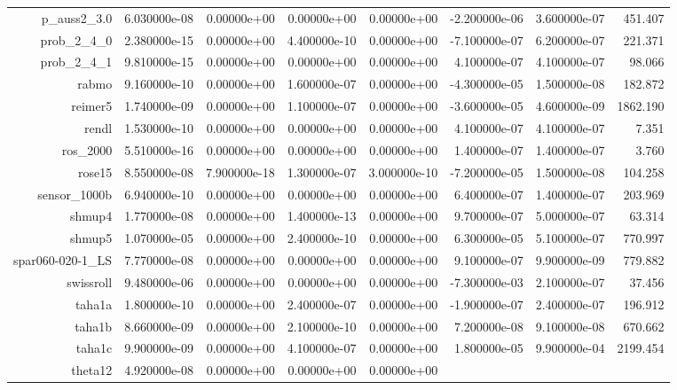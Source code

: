 {{\begin{table}[h]
\begin{center}
{\begin{tabular}{r|r|r|r|r|r|r|r}
	  p\_auss2\_3.0 & 6.030000e-08 & 0.00000e+00 & 0.00000e+00 & 0.00000e+00 &
      -2.200000e-06 & 3.600000e-07 & 451.407\\
      prob\_2\_4\_0 & 2.380000e-15 & 0.00000e+00 & 4.400000e-10 & 0.00000e+00
      & -7.100000e-07 & 6.200000e-07 & 221.371\\
      prob\_2\_4\_1 & 9.810000e-15 & 0.00000e+00 & 0.00000e+00 & 0.00000e+00 &
      4.100000e-07 & 4.100000e-07 & 98.066\\
      rabmo & 9.160000e-10 & 0.00000e+00 & 1.600000e-07 & 0.00000e+00 &
      -4.300000e-05 & 1.500000e-08 & 182.872\\
      reimer5 & 1.740000e-09 & 0.00000e+00 & 1.100000e-07 & 0.00000e+00 &
      -3.600000e-05 & 4.600000e-09 & 1862.190\\
      rendl & 1.530000e-10 & 0.00000e+00 & 0.00000e+00 & 0.00000e+00 &
      4.100000e-07 & 4.100000e-07 & 7.351\\
      ros\_2000 & 5.510000e-16 & 0.00000e+00 & 0.00000e+00 & 0.00000e+00 &
      1.400000e-07 & 1.400000e-07 & 3.760\\
      rose15 & 8.550000e-08 & 7.900000e-18 & 1.300000e-07 & 3.000000e-10 &
      -7.200000e-05 & 1.500000e-08 & 104.258\\
      sensor\_1000b & 6.940000e-10 & 0.00000e+00 & 0.00000e+00 & 0.00000e+00 &
      6.400000e-07 & 1.400000e-07 & 203.969\\
      shmup4 & 1.770000e-08 & 0.00000e+00 & 1.400000e-13 & 0.00000e+00 &
      9.700000e-07 & 5.000000e-07 & 63.314\\
      shmup5 & 1.070000e-05 & 0.00000e+00 & 2.400000e-10 & 0.00000e+00 &
      6.300000e-05 & 5.100000e-07 & 770.997\\
      spar060-020-1\_LS & 7.770000e-08 & 0.00000e+00 & 0.00000e+00 &
      0.00000e+00 & 9.100000e-07 & 9.900000e-09 & 779.882\\
      swissroll & 9.480000e-06 & 0.00000e+00 & 0.00000e+00 & 0.00000e+00 &
      -7.300000e-03 & 2.100000e-07 & 37.456\\
      taha1a & 1.800000e-10 & 0.00000e+00 & 2.400000e-07 & 0.00000e+00 &
      -1.900000e-07 & 2.400000e-07 & 196.912\\
      taha1b & 8.660000e-09 & 0.00000e+00 & 2.100000e-10 & 0.00000e+00 &
      7.200000e-08 & 9.100000e-08 & 670.662\\
      taha1c & 9.900000e-09 & 0.00000e+00 & 4.100000e-07 & 0.00000e+00 &
      1.800000e-05 & 9.900000e-04 & 2199.454\\
      theta12 & 4.920000e-08 & 0.00000e+00 & 0.00000e+00 & 0.00000e+00 &

\end{tabular}}
\end{center}
\end{table}}}
